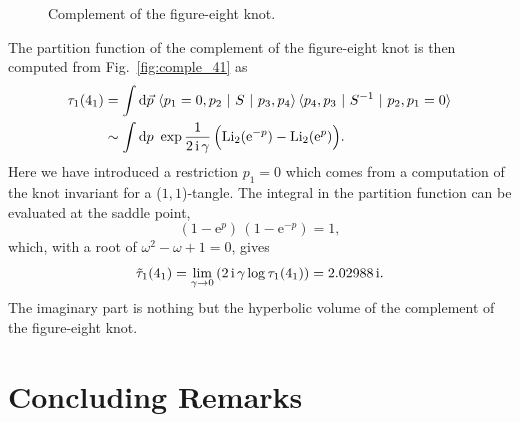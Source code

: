 \documentclass[12pt]{article}
\numberwithin{equation}{section}
\newcommand{\Li}{\mathrm{Li}_2}
\begin{document}
\begin{figure}[htbp]
  \begin{center}
    \begin{psfrags}
    \end{psfrags}
    \caption{Complement of the figure-eight knot.}
    \label{fig:comple_41}
  \end{center}
\end{figure}


The partition function of the complement of the figure-eight knot is
then computed from Fig.~\eqref{fig:comple_41} as
\begin{align}
  {\tau}_1({4_1})
  & =
  \int \mathrm{d} \vec{p} \
  \langle p_1 = 0, p_2 \  | \  S \  | \  p_3, p_4 \rangle \,
  \langle p_4, p_3 \ | \  S^{-1} \  | \  p_2 , p_1=0\rangle
  \nonumber
  \\
%
  & \sim
  \int \mathrm{d} p \
  \exp \frac{1}{2 \, \mathrm{i} \, \gamma} \,
  \Bigl(
    \Li (\mathrm{e}^{-p}) - \Li (\mathrm{e}^p)
  \Bigr) .
\end{align}
Here we have introduced a restriction $p_1=0$ which comes from a
computation of the knot invariant for a ($1,1$)-tangle.
The integral in the partition function can be evaluated at the saddle
point,
\begin{equation*}
  (1- \mathrm{e}^p) \, ( 1 - \mathrm{e}^{-p})=1 ,
\end{equation*}
which, with a root of $\omega^2 - \omega + 1=0$, gives
\begin{equation}
  \Tilde{\tau}_1(4_1)
  =
  \lim_{\gamma \to 0}
  \left(
    2 \, \mathrm{i} \, \gamma \log {\tau}_1(4_1)
  \right)
  =
  2.02988 \, \mathrm{i} .
\end{equation}
The imaginary part is nothing but the hyperbolic volume of the
complement of the figure-eight knot.



\section{Concluding Remarks}
\end{document}
